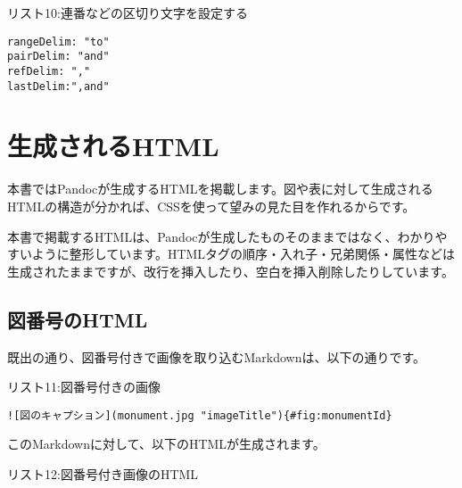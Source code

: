 リスト10:連番などの区切り文字を設定する

\begin{verbatim}
rangeDelim: "to"
pairDelim: "and"
refDelim: ","
lastDelim:",and"
\end{verbatim}

\section{生成されるHTML}\label{ux751fux6210ux3055ux308cux308bhtml}

本書ではPandocが生成するHTMLを掲載します。図や表に対して生成されるHTMLの構造が分かれば、CSSを使って望みの見た目を作れるからです。

本書で掲載するHTMLは、Pandocが生成したものそのままではなく、わかりやすいように整形しています。HTMLタグの順序・入れ子・兄弟関係・属性などは生成されたままですが、改行を挿入したり、空白を挿入削除したりしています。

\subsection{図番号のHTML}\label{ux56f3ux756aux53f7ux306ehtml}

既出の通り、図番号付きで画像を取り込むMarkdownは、以下の通りです。

リスト11:図番号付きの画像

\begin{verbatim}
![図のキャプション](monument.jpg "imageTitle"){#fig:monumentId}
\end{verbatim}

このMarkdownに対して、以下のHTMLが生成されます。

リスト12:図番号付き画像のHTML

\begin{Shaded}
\begin{Highlighting}[]
\DataTypeTok{\textless{}}\OperatorTok{=}\DataTypeTok{\textgreater{}}
    \DataTypeTok{\textless{}}\OperatorTok{=}\OperatorTok{=}\OperatorTok{=}\DataTypeTok{\textgreater{}}
    \DataTypeTok{\textless{}}\DataTypeTok{\textgreater{}}
    \DataTypeTok{\textless{}/}\DataTypeTok{\textgreater{}}
\DataTypeTok{\textless{}/}\DataTypeTok{\textgreater{}}
\end{Highlighting}
\end{Shaded}

